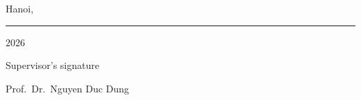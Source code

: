 \documentclass[12pt,a4paper]{article}
\begin{document}
\vspace{2.5cm}
\hfill\begin{minipage}{7cm}
    \centering
    Hanoi, \rule{2.5cm}{0.4pt} 2026\par
    \vspace{0.4cm}
    Supervisor's signature\par
    \vspace{2cm}
    Prof.\ Dr.\ Nguyen Duc Dung\par
\end{minipage}

\clearpage
{}
\setcounter{page}{2}

\renewcommand{\contentsname}{TABLE OF CONTENTS}
\setcounter{tocdepth}{2}
\tableofcontents
\clearpage

\end{document}
